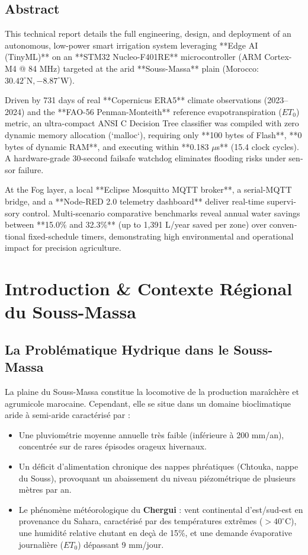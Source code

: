 \documentclass[11pt,a4paper]{report}
\begin{document}
\begin{otherlanguage}{english}
\section*{Abstract}
This technical report details the full engineering, design, and deployment of an autonomous, low-power smart irrigation system leveraging **Edge AI (TinyML)** on an **STM32 Nucleo-F401RE** microcontroller (ARM Cortex-M4 @ 84 MHz) targeted at the arid **Souss-Massa** plain (Morocco: $30.42^\circ\text{N}, -8.87^\circ\text{W}$). 

Driven by 731 days of real **Copernicus ERA5** climate observations (2023--2024) and the **FAO-56 Penman-Monteith** reference evapotranspiration ($ET_0$) metric, an ultra-compact ANSI C Decision Tree classifier was compiled with zero dynamic memory allocation (`malloc`), requiring only **100 bytes of Flash**, **0 bytes of dynamic RAM**, and executing within **0.183 $\mu$s** (15.4 clock cycles). A hardware-grade 30-second failsafe watchdog eliminates flooding risks under sensor failure. 

At the Fog layer, a local **Eclipse Mosquitto MQTT broker**, a serial-MQTT bridge, and a **Node-RED 2.0 telemetry dashboard** deliver real-time supervisory control. Multi-scenario comparative benchmarks reveal annual water savings between **15.0\% and 32.3\%** (up to 1,391 L/year saved per zone) over conventional fixed-schedule timers, demonstrating high environmental and operational impact for precision agriculture.
\end{otherlanguage}

\tableofcontents

\chapter{Introduction \& Contexte Régional du Souss-Massa}

\section{La Problématique Hydrique dans le Souss-Massa}
La plaine du Souss-Massa constitue la locomotive de la production maraîchère et agrumicole marocaine. Cependant, elle se situe dans un domaine bioclimatique aride à semi-aride caractérisé par :
\begin{itemize}
    \item Une pluviométrie moyenne annuelle très faible (inférieure à 200 mm/an), concentrée sur de rares épisodes orageux hivernaux.
    \item Un déficit d'alimentation chronique des nappes phréatiques (Chtouka, nappe du Souss), provoquant un abaissement du niveau piézométrique de plusieurs mètres par an.
    \item Le phénomène météorologique du \textbf{Chergui} : vent continental d'est/sud-est en provenance du Sahara, caractérisé par des températures extrêmes ($> 40^\circ\text{C}$), une humidité relative chutant en deçà de 15\%, et une demande évaporative journalière ($ET_0$) dépassant 9 mm/jour.
\end{itemize}
\end{document}
